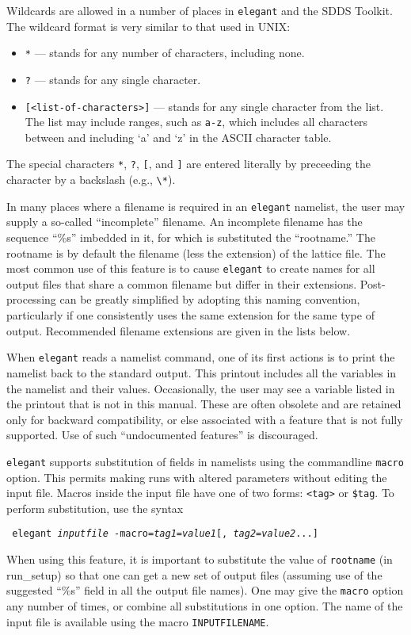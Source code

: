\documentclass[11pt]{article}
\begin{document}
Wildcards are allowed in a number of places in {\tt elegant} and the SDDS Toolkit.  The wildcard format is
very similar to that used in UNIX:
\begin{itemize}
\item \verb|*| --- stands for any number of characters, including none.
\item \verb|?| --- stands for any single character.
\item \verb|[<list-of-characters>]| --- stands for any single character from the list.  The list may include
ranges, such as \verb|a-z|, which includes all characters between and including `a' and `z' in the ASCII
character table.
\end{itemize}
The special characters \verb|*|, \verb|?|, \verb|[|, and \verb|]| are entered literally by preceeding the character by a
backslash (e.g., \verb|\*|).

In many places where a filename is required in an {\tt elegant}
namelist, the user may supply a so-called ``incomplete'' filename.  An
incomplete filename has the sequence ``\%s'' imbedded in it, for which
is substituted the ``rootname.''  The rootname is by default the
filename (less the extension) of the lattice file.  The most common
use of this feature is to cause {\tt elegant} to create names for all
output files that share a common filename but differ in their
extensions.  Post-processing can be greatly simplified by adopting
this naming convention, particularly if one consistently uses the same
extension for the same type of output.  Recommended filename
extensions are given in the lists below.

When {\tt elegant} reads a namelist command, one of its first actions
is to print the namelist back to the standard output.  This printout
includes all the variables in the namelist and their values.
Occasionally, the user may see a variable listed in the printout that
is not in this manual.  These are often obsolete and are retained only
for backward compatibility, or else associated with a feature that is
not fully supported.  Use of such ``undocumented features'' is
discouraged.

{\tt elegant} supports substitution of fields in namelists using the
commandline {\tt macro} option.  This permits making runs with altered
parameters without editing the input file.  Macros inside the input
file have one of two forms: \verb|<tag>| or \verb|$tag|.  To perform
substitution, use the syntax
\begin{flushleft}{\tt
elegant {\em inputfile} -macro={\em tag1}={\em value1}[,{\em
tag2}={\em value2}...]  }\end{flushleft} When using this feature, it
is important to substitute the value of {\tt rootname} (in run\_setup)
so that one can get a new set of output files (assuming use of the
suggested ``\%s'' field in all the output file names).
One may give the {\tt macro} option any number of times, or combine
all substitutions in one option.  The name of the input file is available
using the macro \verb|INPUTFILENAME|.
\end{document}
